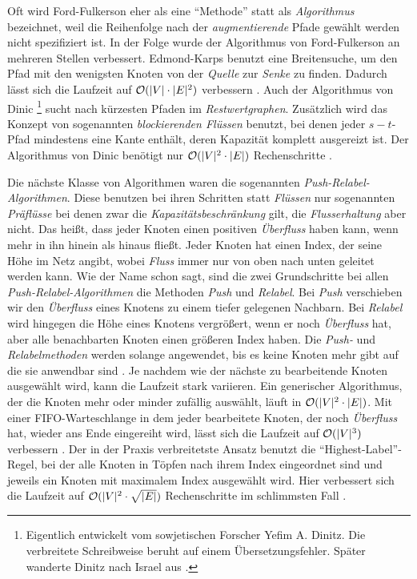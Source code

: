 Oft wird Ford-Fulkerson eher als eine \enquote{Methode} statt als \emph{Algorithmus} bezeichnet, weil die Reihenfolge nach der \emph{augmentierende} Pfade gewählt werden nicht spezifiziert ist. In der Folge wurde der Algorithmus von Ford-Fulkerson an mehreren Stellen verbessert. Edmond-Karps benutzt eine Breitensuche, um den Pfad mit den wenigsten Knoten von der \emph{Quelle} zur \emph{Senke} zu finden. Dadurch lässt sich die Laufzeit auf $\mathcal{O}(|V|\cdot |E|^2)$ verbessern \citep{clrs09}. Auch der Algorithmus von Dinic \footnote{Eigentlich entwickelt vom sowjetischen Forscher Yefim A. Dinitz. Die verbreitete Schreibweise beruht auf einem Übersetzungsfehler. Später wanderte Dinitz nach Israel aus \citep{d06}.} sucht nach kürzesten Pfaden im \emph{Restwertgraphen}. Zusätzlich wird das Konzept von sogenannten \emph{blockierenden Flüssen} benutzt, bei denen jeder $s-t$-Pfad mindestens eine Kante enthält, deren Kapazität komplett ausgereizt ist. Der Algorithmus von Dinic benötigt nur $\mathcal{O}(|V|^2\cdot |E|)$ Rechenschritte \citep{d06}.

Die nächste Klasse von Algorithmen waren die sogenannten \emph{Push-Relabel-Algorithmen}. Diese benutzen bei ihren Schritten statt \emph{Flüssen} nur sogenannten \emph{Präflüsse} bei denen zwar die \emph{Kapazitätsbeschränkung} gilt, die \emph{Flusserhaltung} aber nicht. Das heißt, dass jeder Knoten einen positiven \emph{Überfluss} haben kann, wenn mehr in ihn hinein als hinaus fließt. Jeder Knoten hat einen Index, der seine Höhe im Netz angibt, wobei \emph{Fluss} immer nur von oben nach unten geleitet werden kann. Wie der Name schon sagt, sind die zwei Grundschritte bei allen \emph{Push-Relabel-Algorithmen} die Methoden \emph{Push} und \emph{Relabel}. Bei \emph{Push} verschieben wir den \emph{Überfluss} eines Knotens zu einem tiefer gelegenen Nachbarn. Bei \emph{Relabel} wird hingegen die Höhe eines Knotens vergrößert, wenn er noch \emph{Überfluss} hat, aber alle benachbarten Knoten einen größeren Index haben. Die \emph{Push-} und \emph{Relabelmethoden} werden solange angewendet, bis es keine Knoten mehr gibt auf die sie anwendbar sind \citep{clrs09}. Je nachdem wie der nächste zu bearbeitende Knoten ausgewählt wird, kann die Laufzeit stark variieren. Ein generischer Algorithmus, der die Knoten mehr oder minder zufällig auswählt, läuft in $\mathcal{O}(|V|^2\cdot |E|)$. Mit einer FIFO-Warteschlange in dem jeder bearbeitete Knoten, der noch \emph{Überfluss} hat, wieder ans Ende eingereiht wird, lässt sich die Laufzeit auf $\mathcal{O}(|V|^3)$ verbessern \citep{gt88}. Der in der Praxis verbreitetste Ansatz benutzt die \enquote{Highest-Label}-Regel, bei der alle Knoten in Töpfen nach ihrem Index eingeordnet sind und jeweils ein Knoten mit maximalem Index ausgewählt wird. Hier verbessert sich die Laufzeit auf $\mathcal{O}(|V|^2\cdot \sqrt{|E|})$ Rechenschritte im schlimmsten Fall \citep{akmo97}.

